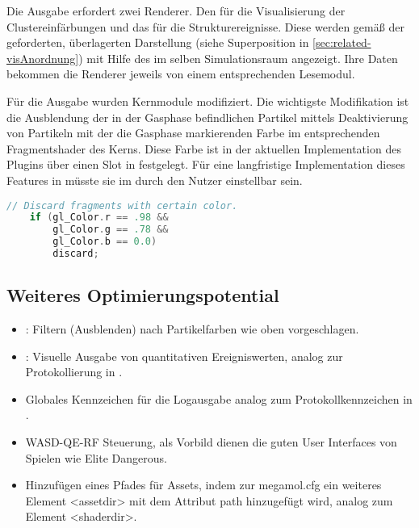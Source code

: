 Die Ausgabe erfordert zwei Renderer. Den  für die Visualisierung der Clustereinfärbungen und das  für die Strukturereignisse. Diese werden gemäß der geforderten, überlagerten Darstellung (siehe Superposition in \autoref{sec:related-visAnordnung}) mit Hilfe des  im selben Simulationsraum angezeigt. Ihre Daten bekommen die Renderer jeweils von einem entsprechenden Lesemodul. 

Für die Ausgabe wurden Kernmodule modifiziert. Die wichtigste Modifikation ist die Ausblendung der in der Gasphase befindlichen Partikel mittels Deaktivierung von Partikeln mit der die Gasphase markierenden Farbe im entsprechenden Fragmentshader des  Kerns. Diese Farbe ist in der aktuellen Implementation des Plugins über einen Slot in \SECalc festgelegt. Für eine langfristige Implementation dieses Features in  müsste sie im  durch den Nutzer einstellbar sein.

\begin{lstlisting}[language=c]
    // Discard fragments with certain color.
    if (gl_Color.r == .98 &&
	    gl_Color.g == .78 &&
	    gl_Color.b == 0.0)
	    discard;
\end{lstlisting}

\subsection*{Weiteres Optimierungspotential}\label{sec:pluginaufbau-optimierung}

\begin{itemize}
	\item {}: Filtern (Ausblenden) nach Partikelfarben wie oben vorgeschlagen.
	\item {}: Visuelle Ausgabe von quantitativen Ereigniswerten, analog zur Protokollierung in \SECalc.
	\item Globales Kennzeichen für die Logausgabe analog zum Protokollkennzeichen in \SECalc.
	\item WASD-QE-RF Steuerung, als Vorbild dienen die guten User Interfaces von Spielen wie Elite Dangerous.
	\item Hinzufügen eines Pfades für Assets, indem zur megamol.cfg ein weiteres Element <assetdir> mit dem Attribut path hinzugefügt wird, analog zum Element <shaderdir>.
\end{itemize}


